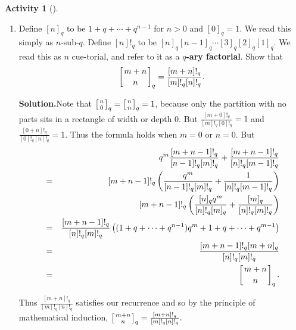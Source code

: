 \documentclass[10pt,]{book}
\newcommand{\terminology}[1]{\textbf{#1}}
\theoremstyle{plain}
\theoremstyle{definition}
\newtheorem{activity}[project]{Activity}
\numberwithin{equation}{chapter}
\newcommand{\qchoose}[2]{\left[{#1\atop#2}\right]_q}
\newcommand{\amp}{&}
\begin{document}
\begin{activity}[]
\begin{enumerate}[label=(\alph*)]
~\par
\item Define \([n]_q\) to be \(1+q+\cdots+q^{n-1}\) for \(n>0\) and \([0]_q =1\).  We read this simply as \(n\)-sub-\(q\). Define \([n]!_q\) to be \([n]_q[n-1]_q\cdots [3]_q[2]_q[1]_q\). We read this as \(n\) cue-torial, and refer to it as a \terminology{\(q\)-ary factorial}. Show that%
\begin{equation*}
\qchoose{m+n}{n} = \frac{[m+n]!_q }{[m]!_q[n]!_q}.
\end{equation*}
%
\par\medskip\noindent%
\textbf{Solution.}\quad Note that \(\qchoose{n}{0}= \qchoose{n}{n} = 1\), because only the partition with no parts sits in a rectangle of width or depth 0. But \(\frac{[m+0]!_q }{[m]!_q[0]!_q} =1\) and \(\frac{[0+n]!_q }{[0]!_q[n]!_q} =1\). Thus the formula holds when \(m=0\) or \(n=0\). But%
\begin{align*}
\amp \amp q^m\frac{[m+n-1]!_q}{[n-1]!_q[m]!_q}+\frac{[m+n-1]!_q}{[n]!_q[m-1]!_q}\\
\amp =\amp \relax[m+n-1]!_q\left(\frac{q^m}{[n-1]!_q[m]!_q}
+\frac{1}{[n]!_q[m-1]!_q}\right)\\
\amp \amp \relax[m+n-1]!_q\left(\frac{[n]_qq^m}{[n]!_q[m]_q}+\frac{[m]_q}{[n]!_q[m]!_q}\right)\\
\amp =\amp \relax\frac{[m+n-1]!_q}{[n]!_q[m]!_q}\left((1+q+\cdots+q^{n-1})q^m +
1+q+\cdots+q^{m-1}\right)\\
\amp =\amp \relax\frac{[m+n-1]!_q[m+n]_q}{[n]!_q[m]!_q}\\
\amp =\amp \qchoose{m+n}{n}.
\end{align*}
%
\par
Thus \(\frac{[m+n]!_q }{[m]!_q[n]!_q}\) satisfies our recurrence and so by the principle of mathematical induction, \(\qchoose{m+n}{n} = \frac{[m+n]!_q }{[m]!_q[n]!_q}.\)%


\end{enumerate}
\end{activity}
\end{document}
